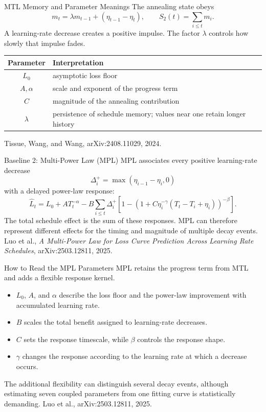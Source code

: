 \documentclass[aspectratio=169]{beamer}
\newcommand{\source}[1]{\vfill{\tiny\color{sourcegray}#1}}
\begin{document}
\begin{frame}{MTL Memory and Parameter Meanings}
  The annealing state obeys
  \[
    m_t=\lambda m_{t-1}+(\eta_{t-1}-\eta_t),
    \qquad
    S_2(t)=\sum_{i\leq t}m_i .
  \]
  A learning-rate decrease creates a positive impulse. The factor \(\lambda\) controls how slowly that impulse fades.
  \begin{center}
  \small
  \begin{tabular}{cl}
    \toprule
    Parameter & Interpretation \\
    \midrule
    \(L_0\) & asymptotic loss floor \\
    \(A,\alpha\) & scale and exponent of the progress term \\
    \(C\) & magnitude of the annealing contribution \\
    \(\lambda\) & persistence of schedule memory; values near one retain longer history \\
    \bottomrule
  \end{tabular}
  \end{center}
  \source{Tissue, Wang, and Wang, arXiv:2408.11029, 2024.}
\end{frame}

\begin{frame}{Baseline 2: Multi-Power Law (MPL)}
  MPL associates every positive learning-rate decrease
  \[
    \Delta_i^+=\max(\eta_{i-1}-\eta_i,0)
  \]
  with a delayed power-law response:
  \[
  \widehat L_t=L_0+A T_t^{-\alpha}
  -B\sum_{i\leq t}\Delta_i^+
  \left[
    1-\left(1+C\eta_i^{-\gamma}(T_t-T_i+\eta_i)\right)^{-\beta}
  \right].
  \]
  The total schedule effect is the sum of these responses. MPL can therefore represent different effects for the timing and magnitude of multiple decay events.
  \source{Luo et al., \emph{A Multi-Power Law for Loss Curve Prediction Across Learning Rate Schedules}, arXiv:2503.12811, 2025.}
\end{frame}

\begin{frame}{How to Read the MPL Parameters}
  MPL retains the progress term from MTL and adds a flexible response kernel.
  \begin{itemize}
    \item \(L_0\), \(A\), and \(\alpha\) describe the loss floor and the power-law improvement with accumulated learning rate.
    \item \(B\) scales the total benefit assigned to learning-rate decreases.
    \item \(C\) sets the response timescale, while \(\beta\) controls the response shape.
    \item \(\gamma\) changes the response according to the learning rate at which a decrease occurs.
  \end{itemize}
  \vspace{0.35em}
  The additional flexibility can distinguish several decay events, although estimating seven coupled parameters from one fitting curve is statistically demanding.
  \source{Luo et al., arXiv:2503.12811, 2025.}
\end{frame}
\end{document}
